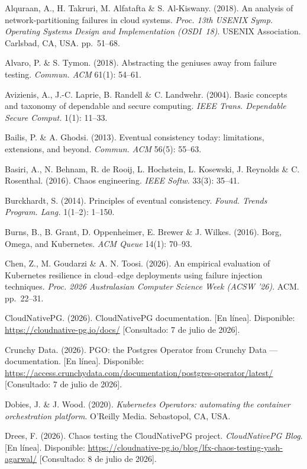 \documentclass[12pt,twocolumn,letterpaper]{article}
\begin{document}
Alquraan, A., H. Takruri, M. Alfatafta \& S. Al-Kiswany. (2018). An analysis of network-partitioning failures in cloud systems. \textit{Proc. 13th USENIX Symp. Operating Systems Design and Implementation (OSDI~18)}. USENIX Association. Carlsbad, CA, USA. pp.~51--68.\par
Alvaro, P. \& S. Tymon. (2018). Abstracting the geniuses away from failure testing. \textit{Commun. ACM} 61(1): 54--61.\par
Avizienis, A., J.-C. Laprie, B. Randell \& C. Landwehr. (2004). Basic concepts and taxonomy of dependable and secure computing. \textit{IEEE Trans. Dependable Secure Comput.} 1(1): 11--33.\par
Bailis, P. \& A. Ghodsi. (2013). Eventual consistency today: limitations, extensions, and beyond. \textit{Commun. ACM} 56(5): 55--63.\par
Basiri, A., N. Behnam, R. de Rooij, L. Hochstein, L. Kosewski, J. Reynolds \& C. Rosenthal. (2016). Chaos engineering. \textit{IEEE Softw.} 33(3): 35--41.\par
Burckhardt, S. (2014). Principles of eventual consistency. \textit{Found. Trends Program. Lang.} 1(1--2): 1--150.\par
Burns, B., B. Grant, D. Oppenheimer, E. Brewer \& J. Wilkes. (2016). Borg, Omega, and Kubernetes. \textit{ACM Queue} 14(1): 70--93.\par
Chen, Z., M. Goudarzi \& A. N. Toosi. (2026). An empirical evaluation of Kubernetes resilience in cloud--edge deployments using failure injection techniques. \textit{Proc. 2026 Australasian Computer Science Week (ACSW '26)}. ACM. pp.~22--31.\par
CloudNativePG. (2026). CloudNativePG documentation. [En línea]. Disponible: \url{https://cloudnative-pg.io/docs/} [Consultado: 7 de julio de 2026].\par
Crunchy Data. (2026). PGO: the Postgres Operator from Crunchy Data --- documentation. [En línea]. Disponible: \url{https://access.crunchydata.com/documentation/postgres-operator/latest/} [Consultado: 7 de julio de 2026].\par
Dobies, J. \& J. Wood. (2020). \textit{Kubernetes Operators: automating the container orchestration platform}. O'Reilly Media. Sebastopol, CA, USA.\par
Drees, F. (2026). Chaos testing the CloudNativePG project. \textit{CloudNativePG Blog}. [En línea]. Disponible: \url{https://cloudnative-pg.io/blog/lfx-chaos-testing-yash-agarwal/} [Consultado: 8 de julio de 2026].\par
\end{document}

